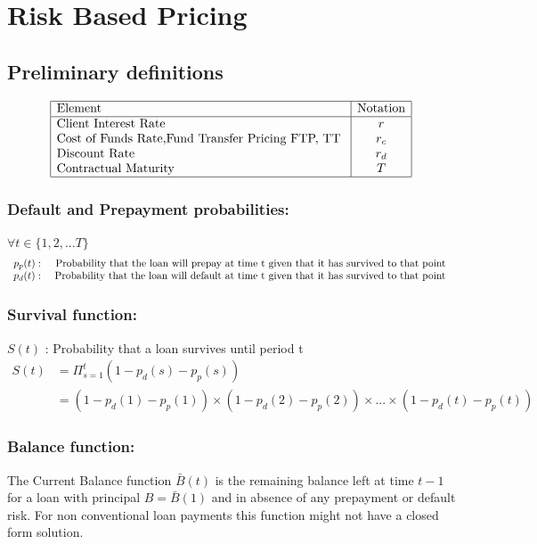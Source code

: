 
\chapter{Risk Based Pricing}
\section{ Preliminary definitions} 

\renewcommand{\arraystretch}{1.5} %
\begin{center} %
\[ %
\begin{array}{|l|c|l|} \hline %
\mbox{Element} & \mbox{Notation}\\ \hline
\mbox{Client Interest Rate}  & r \\
\mbox{Cost of Funds Rate,Fund Transfer Pricing FTP, TT   }  & r_c \\
\mbox{Discount Rate }  & r_d\\
\mbox{Contractual Maturity }  & T \\
\hline
\end{array} %
\] %
\end{center}

\subsection{Default and Prepayment probabilities:}
$ \forall t \in \{1,2,...T\}$
\[ 
\begin{array}{rr} 
   p_p(t)  :&  \mbox{
   Probability that the loan will prepay at time t given that it has survived to that point } \\
   p_d(t)  : &  \mbox{
   Probability that the loan will default at time t given that it has survived to that point
   }
\end{array} \noindent
\] 

 \subsection{Survival function:}
$S(t)$ :   Probability that a loan survives until period t 
\begin{align}
S(t) & = \Pi_{s=1}^t (1-p_d(s) - p_p(s)) \\
 & = (1-p_d(1) - p_p(1))\times(1-p_d(2) - p_p(2))\times...\times(1-p_d(t) - p_p(t)) \nonumber
\end{align}

\subsection{Balance function: }
The Current Balance function $\bar{B}(t)$ is the remaining balance left at time $t-1$ for a loan with principal $B=\bar{B}(1)$ and in absence of any prepayment or default risk. For non conventional loan payments this function might not have a closed form solution. 



